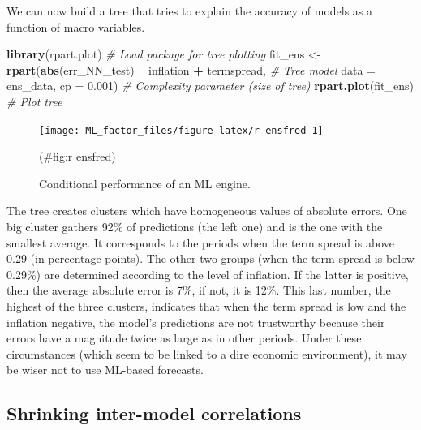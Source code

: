 \documentclass[]{krantz}
\makeatletter
\newenvironment{Shaded}{\begin{snugshade}}{\end{snugshade}}
\newcommand{\CommentTok}[1]{\textcolor[rgb]{0.37,0.37,0.37}{\textit{#1}}}
\newcommand{\DataTypeTok}[1]{\textcolor[rgb]{0.27,0.27,0.27}{#1}}
\newcommand{\FloatTok}[1]{\textcolor[rgb]{0.06,0.06,0.06}{#1}}
\newcommand{\KeywordTok}[1]{\textcolor[rgb]{0.27,0.27,0.27}{\textbf{#1}}}
\newcommand{\NormalTok}[1]{#1}
\newcommand{\OperatorTok}[1]{\textcolor[rgb]{0.43,0.43,0.43}{\textbf{#1}}}
\newcommand{\StringTok}[1]{\textcolor[rgb]{0.5,0.5,0.5}{#1}}
\newenvironment{kframe}{%
\medskip{}
\setlength{\fboxsep}{.8em}
 \def\at@end@of@kframe{}%
 \ifinner\ifhmode%
  \def\at@end@of@kframe{\end{minipage}}%
  \begin{minipage}{\columnwidth}%
 \fi\fi%
 \def\FrameCommand##1{\hskip\@totalleftmargin \hskip-\fboxsep
 \colorbox{shadecolor}{##1}\hskip-\fboxsep
     \hskip-\linewidth \hskip-\@totalleftmargin \hskip\columnwidth}%
 \MakeFramed {\advance\hsize-\width
   \@totalleftmargin\z@ \linewidth\hsize
   \@setminipage}}%
 {\par\unskip\endMakeFramed%
 \at@end@of@kframe}
\renewenvironment{Shaded}{\begin{kframe}}{\end{kframe}}
\theoremstyle{definition}
\theoremstyle{definition}
\theoremstyle{definition}
\theoremstyle{remark}
\makeatother
\begin{document}
\normalsize

We can now build a tree that tries to explain the accuracy of models as
a function of macro variables.

\footnotesize

\begin{Shaded}
\begin{Highlighting}[]
\KeywordTok{library}\NormalTok{(rpart.plot)     }\CommentTok{# Load package for tree plotting}
\NormalTok{fit_ens <-}\StringTok{ }\KeywordTok{rpart}\NormalTok{(}\KeywordTok{abs}\NormalTok{(err_NN_test) }\OperatorTok{~}\StringTok{ }\NormalTok{inflation }\OperatorTok{+}\StringTok{ }\NormalTok{termspread, }\CommentTok{# Tree model}
                 \DataTypeTok{data =}\NormalTok{ ens_data,}
                 \DataTypeTok{cp =} \FloatTok{0.001}\NormalTok{)                                }\CommentTok{# Complexity parameter (size of tree)}
\KeywordTok{rpart.plot}\NormalTok{(fit_ens)                                         }\CommentTok{# Plot tree}
\end{Highlighting}
\end{Shaded}

\begin{figure}[H]

{\centering \texttt{[image: ML\_factor\_files/figure-latex/r ensfred-1]} 

}

\caption{Conditional performance of an ML engine.}(\#fig:r ensfred)
\end{figure}

\normalsize

The tree creates clusters which have homogeneous values of absolute
errors. One big cluster gathers 92\% of predictions (the left one) and
is the one with the smallest average. It corresponds to the periods when
the term spread is above 0.29 (in percentage points). The other two
groups (when the term spread is below 0.29\%) are determined according
to the level of inflation. If the latter is positive, then the average
absolute error is 7\%, if not, it is 12\%. This last number, the highest
of the three clusters, indicates that when the term spread is low and
the inflation negative, the model's predictions are not trustworthy
because their errors have a magnitude twice as large as in other
periods. Under these circumstances (which seem to be linked to a dire
economic environment), it may be wiser not to use ML-based forecasts.

\hypertarget{shrinking-inter-model-correlations}{%
\subsection{Shrinking inter-model
correlations}\label{shrinking-inter-model-correlations}}
\end{document}
